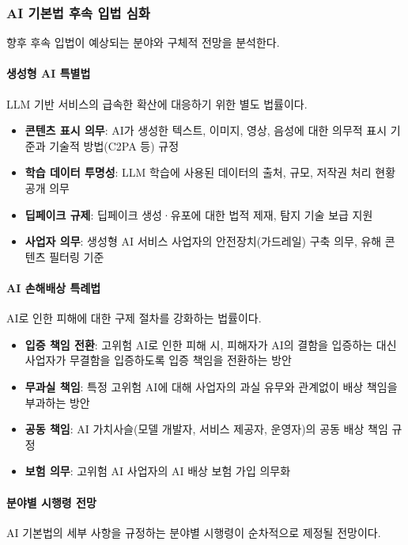 \subsubsection{AI 기본법 후속 입법 심화}

향후 후속 입법이 예상되는 분야와 구체적 전망을 분석한다.

\paragraph{생성형 AI 특별법}
LLM 기반 서비스의 급속한 확산에 대응하기 위한 별도 법률이다.

\begin{itemize}
 \item \textbf{콘텐츠 표시 의무}: AI가 생성한 텍스트, 이미지, 영상, 음성에 대한 의무적 표시 기준과 기술적 방법(C2PA 등) 규정
 \item \textbf{학습 데이터 투명성}: LLM 학습에 사용된 데이터의 출처, 규모, 저작권 처리 현황 공개 의무
 \item \textbf{딥페이크 규제}: 딥페이크 생성·유포에 대한 법적 제재, 탐지 기술 보급 지원
 \item \textbf{사업자 의무}: 생성형 AI 서비스 사업자의 안전장치(가드레일) 구축 의무, 유해 콘텐츠 필터링 기준
\end{itemize}

\paragraph{AI 손해배상 특례법}
AI로 인한 피해에 대한 구제 절차를 강화하는 법률이다.

\begin{itemize}
 \item \textbf{입증 책임 전환}: 고위험 AI로 인한 피해 시, 피해자가 AI의 결함을 입증하는 대신 사업자가 무결함을 입증하도록 입증 책임을 전환하는 방안
 \item \textbf{무과실 책임}: 특정 고위험 AI에 대해 사업자의 과실 유무와 관계없이 배상 책임을 부과하는 방안
 \item \textbf{공동 책임}: AI 가치사슬(모델 개발자, 서비스 제공자, 운영자)의 공동 배상 책임 규정
 \item \textbf{보험 의무}: 고위험 AI 사업자의 AI 배상 보험 가입 의무화
\end{itemize}

\paragraph{분야별 시행령 전망}
AI 기본법의 세부 사항을 규정하는 분야별 시행령이 순차적으로 제정될 전망이다.

